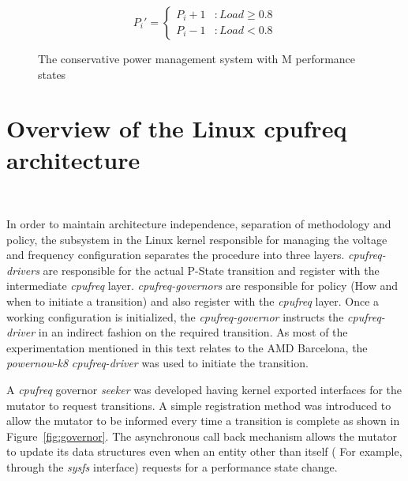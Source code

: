 \begin{figure}[h!]
\centering
\begin{equation*}
    P_{i}' = \left\{ \begin{array}{lr} 
                   P_{i}+1 & : Load \geq 0.8 \\
		   P_{i}-1 & : Load < 0.8
                  \end{array} \right.
\end{equation*}
\caption{The conservative power management system with M performance states}
\label{fig:math_conservative}
\end{figure}

\section{Overview of the Linux cpufreq architecture}~\label{sec:cpufreq}

In order to maintain architecture independence, separation of methodology 
and policy, the subsystem in the Linux kernel responsible for managing the 
voltage and frequency configuration separates the procedure into three layers. \textit{cpufreq-drivers}
are responsible for the actual P-State transition and register with the 
intermediate \textit{cpufreq} layer. \textit{cpufreq-governors} are responsible for
policy (How and when to initiate a transition) and also register with the 
\textit{cpufreq} layer. Once a working configuration is initialized, the 
\textit{cpufreq-governor} instructs the \textit{cpufreq-driver} in an indirect
fashion on the required transition. As most of the experimentation mentioned in
this text relates to the AMD Barcelona, the \textit{powernow-k8} \textit{cpufreq-driver}
was used to initiate the transition. 

A \textit{cpufreq} governor \textit{seeker}
was developed having kernel exported interfaces for the mutator to request transitions. 
A simple registration method was introduced to allow the mutator to be informed 
every time a transition is complete as shown in Figure~\ref{fig:governor}. 
The asynchronous call back mechanism allows the mutator to
update its data structures even when an entity other than itself ( For example, through
the \textit{sysfs} interface) requests for a performance state change. 

